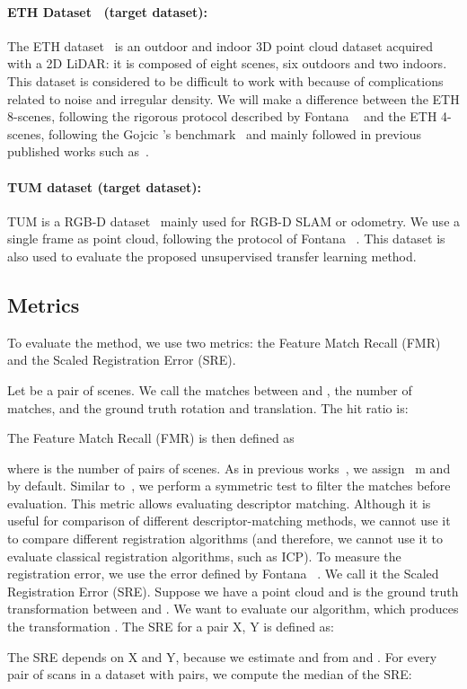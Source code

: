 \documentclass[10pt,twocolumn,letterpaper]{article}
\begin{document}
\paragraph{ETH Dataset~\cite{Pomerleau:2012} (target dataset):}
The ETH dataset~\cite{Pomerleau:2012} is an outdoor and indoor 3D point cloud dataset acquired with a 2D LiDAR: it is composed of eight scenes, six outdoors and two indoors. 
This dataset is considered 
to be difficult to work with because of complications related to noise and irregular density.
We will make a difference between the ETH 8-scenes, following the rigorous protocol described by Fontana \etal~\cite{fontana2020benchmark} and the ETH 4-scenes, following the Gojcic \etal's benchmark~\cite{gojcic2018perfect} and mainly followed in previous published works such as~\cite{bai2020d3feat, ao2020SpinNet, Poiesi2021, gojcic2018perfect, Poiesi2021gedi}.


\paragraph{TUM dataset \cite{sturm12iros} (target dataset):}
TUM is a RGB-D dataset~\cite{sturm12iros} mainly used for RGB-D SLAM or odometry. We use a single frame as point cloud, following the protocol of Fontana \etal~\cite{fontana2020benchmark}. This dataset is also used to evaluate the proposed unsupervised transfer learning method.

\subsection{Metrics}
To evaluate the method, we use two metrics: the Feature Match Recall (FMR) and the Scaled Registration Error (SRE).

Let  be a pair of scenes. 
We call  the matches between  and ,  the number of matches, and  the ground truth rotation and translation.
The hit ratio is:


The Feature Match Recall (FMR) is then defined as

where  is the number of pairs of scenes. As in previous works~\cite{gojcic2018perfect, bai2020d3feat, choy2019fully, Poiesi2021}, we assign ~m and  by default. Similar to~\cite{gojcic2018perfect, bai2020d3feat, ao2020SpinNet, Poiesi2021, Li_2020_CVPR}, we perform a symmetric test to filter the matches before evaluation. This metric allows evaluating descriptor matching. Although it is useful for comparison of different descriptor-matching methods, we cannot use it to compare different registration algorithms (and therefore, we cannot use it to evaluate classical registration algorithms, such as ICP).
To measure the registration error, we use the error defined by Fontana \etal~\cite{fontana2020benchmark}. We call it the Scaled Registration Error (SRE).
Suppose we have a point cloud  and  is the ground truth transformation between  and . We want to evaluate our algorithm, which produces the transformation .
The SRE for a pair X, Y is defined as:
{\scriptsize

}The SRE depends on X and Y, because we estimate  and  from  and .
For every pair of scans in a dataset with  pairs, we compute the median of the SRE:
\end{document}

